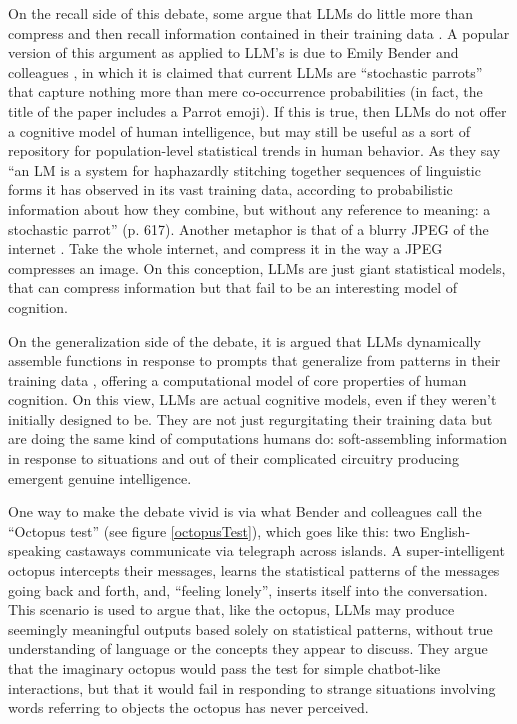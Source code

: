 On the recall side of this debate, some argue that LLMs do little more than
compress and then recall information contained in their training data
\cite{bender2021dangers, chiang2023jpeg}. A popular version of this argument
as applied to LLM's is due to Emily Bender and colleagues
\cite{bender2021dangers}, in which it is claimed that current LLMs are
``stochastic parrots'' that capture nothing more than mere co-occurrence
probabilities (in fact, the title of the paper includes a Parrot emoji). If
this is true, then LLMs do not offer a cognitive model of human intelligence,
but may still be useful as a sort of repository for population-level
statistical trends in human behavior. As they say ``an LM is a system for
haphazardly stitching together sequences of linguistic forms it has observed in
its vast training data, according to probabilistic information about how they
combine, but without any reference to meaning: a stochastic parrot'' (p. 617).
Another metaphor is that of a blurry JPEG of the internet
\cite{chiang2023jpeg}. Take the whole internet, and compress it in the way a
JPEG compresses an image. On this conception, LLMs are just giant statistical
models, that can compress information but that fail to be an interesting model of cognition.

On the generalization side of the debate, it is argued that LLMs dynamically
assemble functions in response to prompts that generalize from patterns in
their training data \cite{kello2024emergent}, offering a computational model of
core properties of human cognition. On this view, LLMs are actual cognitive
models, even if they weren't initially designed to be. They are not just
regurgitating their training data but are doing the same kind of computations
humans do: soft-assembling information in response to situations and out of
their complicated circuitry producing emergent genuine intelligence.

One way to make the debate vivid is via what Bender and colleagues call the
``Octopus test'' \cite{bender2020climbing} (see figure \ref{octopusTest}),
which goes like this: two English-speaking castaways communicate via telegraph
across islands. A super-intelligent octopus intercepts their messages, learns
the statistical patterns of the messages going back and forth, and, ``feeling
lonely'', inserts itself into the conversation. This scenario is used to argue
that, like the octopus, LLMs may produce seemingly meaningful outputs based
solely on statistical patterns, without true understanding of language or the
concepts they appear to discuss. They argue that the imaginary octopus would
pass the test for simple chatbot-like interactions, but that it would fail in
responding to strange situations involving words referring to objects the
octopus has never perceived. 

